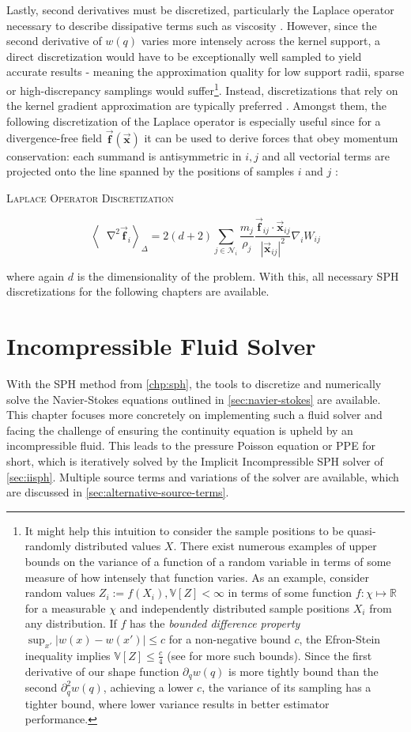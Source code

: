 \documentclass[oneside, a4paper]{book}
\newcommand{\equationnamed}[2]{%
  \setlength{\fboxsep}{2pt} %
  \setlength{\fboxrule}{0.01pt}
  \begin{center}
    \begin{minipage}{\textwidth}
      \begin{center}\textsc{#1}\end{center}
      #2
    \end{minipage}
  \end{center}
}
\newcommand\abs[1]{\left|#1\right|}
\newcommand\angled[1]{\left\langle#1\right\rangle}
\newcommand*\Laplace{\mathop{}\!\mathbin\nabla^2}
\newcommand\vek[1]{\vec{\bm{#1}}}
\begin{document}
    Lastly, second derivatives must be discretized, particularly the Laplace operator necessary to describe dissipative terms such as viscosity \autocite{price-2012}. However, since the second derivative of $w(q)$ varies more intensely across the kernel support, a direct discretization would have to be exceptionally well sampled to yield accurate results - meaning the approximation quality for low support radii, sparse or high-discrepancy samplings would suffer\footnote{It might help this intuition to consider the sample positions to be quasi-randomly distributed values $X$. There exist numerous examples of upper bounds on the variance of a function of a random variable in terms of some measure of how intensely that function varies. As an example, consider random values $Z_i:=f(X_i), \mathds{V}[Z]<\infty$ in terms of some function $f:\chi\mapsto\mathds{R}$ for a measurable $\chi$ and independently distributed sample positions $X_i$ from any distribution. If $f$ has the \textit{bounded difference property} $\sup_{x'} \abs{w(x)-w(x')}\leq c$ for a non-negative bound $c$, the Efron-Stein inequality implies $\mathds{V}[Z] \leq \frac{c}{4}$ (see \cite[Boucheron et al.]{bounded-variance} for more such bounds). Since the first derivative of our shape function $\partial_qw(q)$ is more tightly bound than the second $\partial_q^2 w(q)$, achieving a lower $c$, the variance of its sampling has a tighter bound, where lower variance results in better estimator performance.}. Instead, discretizations that rely on the kernel gradient approximation are typically preferred \autocite{tutorial2019}. Amongst them, the following discretization of the Laplace operator is especially useful since for a divergence-free field $\vek{f}(\vek{x})$ it can be used to derive forces that obey momentum conservation: each summand is antisymmetric in $i,j$ and all vectorial terms are projected onto the line spanned by the positions of samples $i$ and $j$ \autocite{tutorial2019}:
    \equationnamed{Laplace Operator Discretization}{
      \begin{equation}\label{eq:sph-laplace}
        \angled{\Laplace\vek{f}_i}_\Delta = 2(d+2)\sum_{j\in\mathcal{N}_i}\frac{m_j}{\rho_j} \frac{\vek{f}_{ij}\cdot\vek{x}_{ij}}{\abs{\vek{x}_{ij}}^2}\nabla_i W_{ij}
      \end{equation}
    }
    where again $d$ is the dimensionality of the problem. With this, all necessary SPH discretizations for the following chapters are available.

\chapter{Incompressible Fluid Solver}\label{chp:fluid}
  With the SPH method from \autoref{chp:sph}, the tools to discretize and numerically solve the Navier-Stokes equations outlined in \autoref{sec:navier-stokes} are available. This chapter focuses more concretely on implementing such a fluid solver and facing the challenge of ensuring the continuity equation is upheld by an incompressible fluid. This leads to the pressure Poisson equation or PPE for short, which is iteratively solved by the Implicit Incompressible SPH solver of \autoref{sec:iisph}. Multiple source terms and variations of the solver are available, which are discussed in \autoref{sec:alternative-source-terms}.
\end{document}
